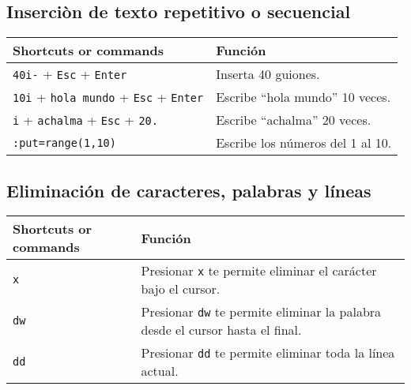 \documentclass[
  doc,
  floatsintext,
  longtable,
  a4paper,
  nolmodern,
  notxfonts,
  notimes,
  colorlinks=true,linkcolor=blue,citecolor=blue,urlcolor=blue]{apa7}
\begin{document}
\subsection{Inserciòn de texto repetitivo o
secuencial}\label{inserciuxf2n-de-texto-repetitivo-o-secuencial}

\begin{longtable}[]{@{}
  >{\raggedright\arraybackslash}p{}
  >{\raggedright\arraybackslash}p{}@{}}
\toprule\noalign{}
\begin{minipage}[b]{\linewidth}\raggedright
Shortcuts or commands
\end{minipage} & \begin{minipage}[b]{\linewidth}\raggedright
Función
\end{minipage} \\
\midrule\noalign{}
\endhead
\bottomrule\noalign{}
\endlastfoot
\texttt{40i-} + \texttt{Esc} + \texttt{Enter} & Inserta 40 guiones. \\
\texttt{10i} + \texttt{hola\ mundo} + \texttt{Esc} + \texttt{Enter} &
Escribe ``hola mundo'' 10 veces. \\
\texttt{i} + \texttt{achalma} + \texttt{Esc} + \texttt{20.} & Escribe
``achalma'' 20 veces. \\
\texttt{:put=range(1,10)} & Escribe los números del 1 al 10. \\
\end{longtable}

\subsection{Eliminación de caracteres, palabras y
líneas}\label{eliminaciuxf3n-de-caracteres-palabras-y-luxedneas}

\begin{longtable}[]{@{}
  >{\raggedright\arraybackslash}p{}
  >{\raggedright\arraybackslash}p{}@{}}
\toprule\noalign{}
\begin{minipage}[b]{\linewidth}\raggedright
Shortcuts or commands
\end{minipage} & \begin{minipage}[b]{\linewidth}\raggedright
Función
\end{minipage} \\
\midrule\noalign{}
\endhead
\bottomrule\noalign{}
\endlastfoot
\texttt{x} & Presionar \texttt{x} te permite eliminar el carácter bajo
el cursor. \\
\texttt{dw} & Presionar \texttt{dw} te permite eliminar la palabra desde
el cursor hasta el final. \\
\texttt{dd} & Presionar \texttt{dd} te permite eliminar toda la línea
actual. \\
\end{longtable}
\end{document}
